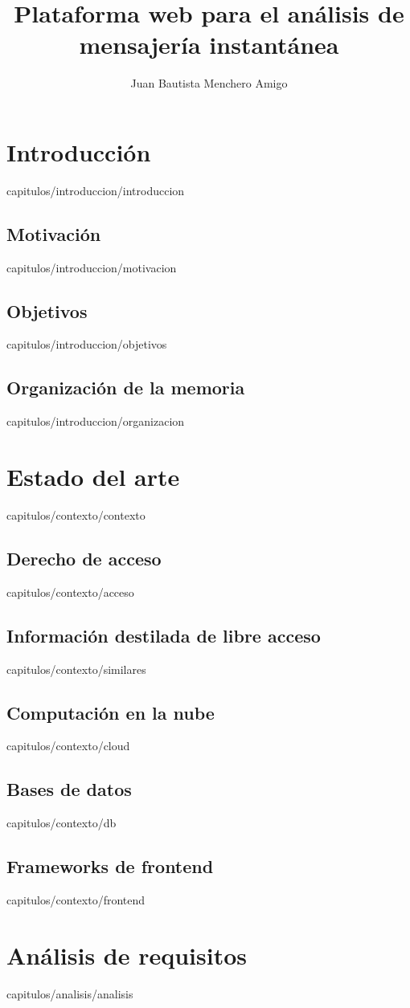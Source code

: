 \documentclass[epsbased,lof,copyright,final,printable,covers,extendedindex,firstnumbered,tfg,gnuplot]{thesis}
\title{Plataforma web para el análisis de mensajería instantánea}
\author{Juan Bautista Menchero Amigo}
\begin{document}
\chapter{Introducción\label{CAP:INTRODUCCION}}{capitulos/introduccion/introduccion}
  \section{Motivación\label{SEC:MOTIVACION}}{capitulos/introduccion/motivacion}
  \section{Objetivos\label{SEC:OBJETIVOS}}{capitulos/introduccion/objetivos}
  \section{Organización de la memoria\label{SEC:ORGANIZACION}}{capitulos/introduccion/organizacion}

\chapter{Estado del arte\label{CAP:CONTEXTO}}{capitulos/contexto/contexto}
  \section{Derecho de acceso\label{SEC:ACCESO}}{capitulos/contexto/acceso}
  \section{Información destilada de libre acceso\label{SEC:SIMILARES}}{capitulos/contexto/similares}
  \section{Computación en la nube\label{SEC:CLOUD}}{capitulos/contexto/cloud}
  \section{Bases de datos\label{SEC:DB}}{capitulos/contexto/db}
  \section{Frameworks de frontend\label{SEC:FRONTEND}}{capitulos/contexto/frontend}

\chapter{Análisis de requisitos\label{CAP:ANALISIS}}{capitulos/analisis/analisis}
\end{document}
